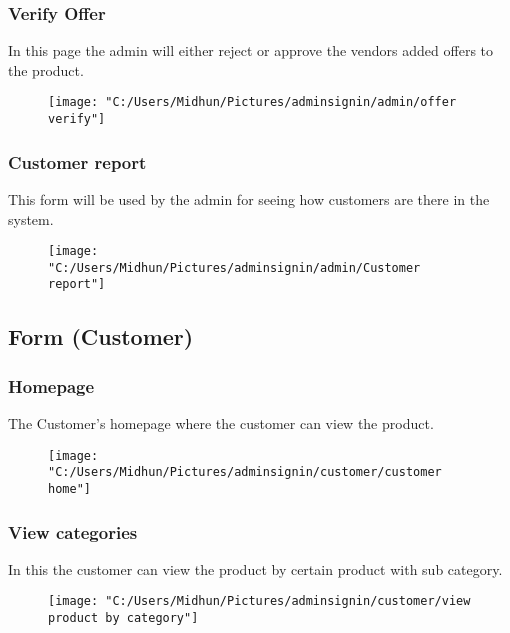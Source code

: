 \documentclass{beamer}
\begin{document}
\begin{frame}
\subsubsection{Verify Offer}
In this page the admin will either reject or approve the vendors added offers to the product.

\begin{figure}[bph]
	\centering
	\texttt{[image: "C:/Users/Midhun/Pictures/adminsignin/admin/offer verify"]}
	\label{fig:admin-signin}
\end{figure}
\end{frame}

\begin{frame}
\subsubsection{Customer report}
This form will be used by the admin for seeing how customers are there in the system.

\begin{figure}[bph]
	\centering
	\texttt{[image: "C:/Users/Midhun/Pictures/adminsignin/admin/Customer report"]}
	\label{fig:admin-signin}
\end{figure}


\end{frame}

\begin{frame}
\section{Form (Customer)}
\subsubsection{Homepage}
The Customer's homepage where the customer can view the product.
\begin{figure}[bph]
	\centering
	\texttt{[image: "C:/Users/Midhun/Pictures/adminsignin/customer/customer home"]}
	\label{fig:admin-signin}
\end{figure}

\end{frame}

\begin{frame}
	\subsubsection{View categories}
	In this the customer can view the product by certain product with sub category.
	\begin{figure}[bph]
		\centering
		\texttt{[image: "C:/Users/Midhun/Pictures/adminsignin/customer/view product by category"]}
		\label{fig:admin-signin}
	\end{figure}
	
\end{frame}
\end{document}
